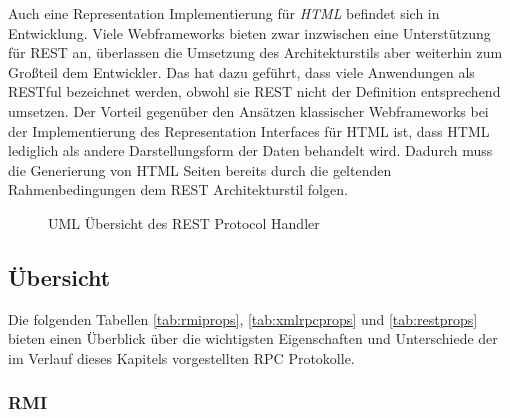 Auch eine Representation Implementierung für \emph{\ac{HTML}} befindet sich in
Entwicklung. Viele Webframeworks bieten zwar inzwischen eine Unterstützung für
\ac{REST} an, überlassen die Umsetzung des Architekturstils aber weiterhin zum
Großteil dem Entwickler. Das hat dazu geführt, dass viele Anwendungen als RESTful
bezeichnet werden, obwohl sie \ac{REST} nicht der Definition entsprechend
umsetzen. Der Vorteil gegenüber den Ansätzen klassischer Webframeworks bei der
Implementierung des Representation Interfaces für \ac{HTML} ist, dass \ac{HTML}
lediglich als andere Darstellungsform der Daten behandelt wird. Dadurch muss die
Generierung von \ac{HTML} Seiten bereits durch die geltenden Rahmenbedingungen
dem \ac{REST} Architekturstil folgen.

\begin{figure}[bth]
	\caption{UML Übersicht des REST Protocol Handler}
	\label{ill:restuml}
\end{figure}

\pagebreak
\subsection{Übersicht}\label{subsec:handlerabstract}
Die folgenden Tabellen \ref{tab:rmiprops}, \ref{tab:xmlrpcprops} und
\ref{tab:restprops} bieten einen Überblick über die wichtigsten Eigenschaften
und Unterschiede der im Verlauf dieses Kapitels vorgestellten \ac{RPC}
Protokolle.

\subsubsection{RMI}

